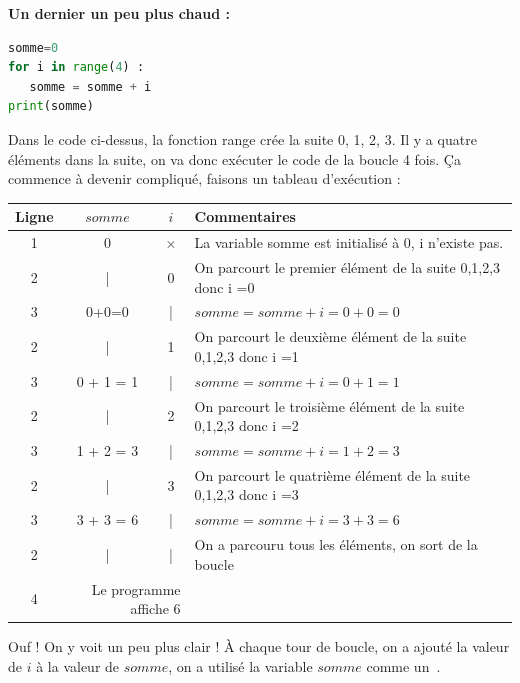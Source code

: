 \begin{center}{\textbf{\large Un dernier un peu plus chaud :}}\end{center}
\begin{lstlisting}[style=pythonstyle, language=python]
somme=0
for i in range(4) :
   somme = somme + i
print(somme)
\end{lstlisting}
Dans le code ci-dessus, la fonction range crée la suite 0, 1, 2, 3. Il y a quatre éléments dans la suite, on va donc exécuter le code de la boucle 4 fois.
Ça commence à devenir compliqué, faisons un tableau d'exécution :
\begin{center}
\begin{tabular}{c|c c   | l}
     {\color{blue}Ligne} & $somme$ & $i$ & {\color{gray} Commentaires}\\ \hline
     {\color{blue}1} & 0  & $\times$ & {\color{gray}La variable somme est initialisé à 0, i n'existe pas.} \\
     {\color{blue}2} & | & 0 & {\color{gray} On parcourt le premier élément de la suite 0,1,2,3 donc i =0} \\
     {\color{blue}3} & 0+0=0 & | & {\color{gray}$somme = somme + i = 0 + 0 = 0$} \\
     {\color{blue}2} & | & 1 & {\color{gray}On parcourt le deuxième élément de la suite 0,1,2,3 donc i =1}\\
     {\color{blue}3} & 0 + 1 = 1 & | & {\color{gray}$somme = somme + i = 0 + 1 = 1$} \\
     {\color{blue}2} & | & 2 & {\color{gray}On parcourt le troisième élément de la suite 0,1,2,3 donc i =2}\\
     {\color{blue}3} & 1 + 2 = 3 & | & {\color{gray}$somme = somme + i = 1 + 2 = 3$}\\
     {\color{blue}2} & | & 3 & {\color{gray}On parcourt le quatrième élément de la suite 0,1,2,3 donc i =3}\\
     {\color{blue}3} & 3 + 3 = 6 & | & {\color{gray}$somme = somme + i = 3 + 3 = 6$}\\
     {\color{blue}2} & | & | & {\color{gray}On a parcouru tous les éléments, on sort de la boucle}\\
     {\color{blue}4} & \multicolumn{2}{r}{Le programme affiche 6} &\\
\end{tabular}
\end{center}
Ouf ! On y voit un peu plus clair ! À chaque tour de boucle, on a ajouté la valeur de $i$ à la valeur de $somme$, on a utilisé la variable $somme$ comme un~.


